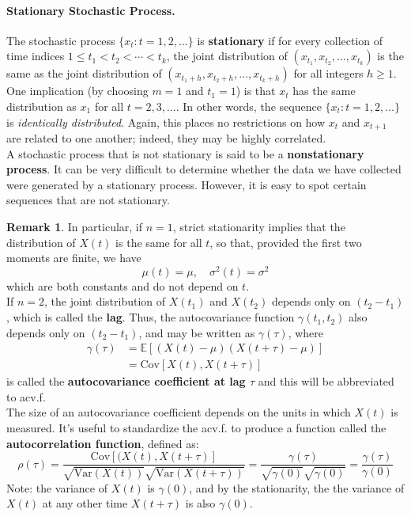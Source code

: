 \documentclass[a4paper, 10pt]{article}
\theoremstyle{definition}	%
\newtheorem*{remark}{Remark}
\begin{document}
\paragraph{Stationary Stochastic Process.}  
The stochastic process \( \{x_t: t = 1, 2, \dots \} \) is \textbf{stationary} if for every collection of time indices \( 1 \leq t_1 < t_2 < \cdots < t_k \), the joint distribution of \( (x_{t_1}, x_{t_2}, \ldots, x_{t_k}) \) is the same as the joint distribution of \( (x_{t_1+h}, x_{t_2+h}, \ldots, x_{t_k+h}) \) for all integers \( h \geq 1 \).\\
One implication (by choosing \( m = 1 \) and \( t_1 = 1 \)) is that \( x_t \) has the same distribution as \( x_1 \) for all \( t = 2, 3, \ldots \). In other words, the sequence \( \{x_t : t = 1, 2, \ldots\} \) is \textit{identically distributed}. Again, this places no restrictions on how \( x_t \) and \( x_{t+1} \) are related to one another; indeed, they may be highly correlated.\\
A stochastic process that is not stationary is said to be a \textbf{nonstationary process}. It can be very difficult to determine whether the data we have collected were generated by a stationary process. However, it is easy to spot certain sequences that are not stationary.
\begin{remark}
In particular, if \( n = 1 \), strict stationarity implies that the distribution of \( X(t) \) is the same for all \( t \), so that, provided the first two moments are finite, we have
\[
\mu(t) = \mu, \quad \sigma^2(t) = \sigma^2
\]
which are both constants and do not depend on \( t \).\\
If \( n = 2 \), the joint distribution of \( X(t_1) \) and \( X(t_2) \) depends only on \( (t_2 - t_1) \), which is called the \textbf{lag}.
Thus, the autocovariance function \( \gamma(t_1, t_2) \) also depends only on \( (t_2 - t_1) \), and may be written as \( \gamma(\tau) \), where
\begin{align*}
    \gamma(\tau) &= \mathbb{E} \left[ (X(t) - \mu)(X(t+\tau) - \mu) \right]\\ 
    &= \text{Cov}[X(t), X(t+\tau)]
\end{align*}
is called the \textbf{autocovariance coefficient at lag \( \tau \)} and this will be abbreviated to acv.f.\\
The size of an autocovariance coefficient depends on the units in which \( X(t) \) is measured. It's useful to standardize the acv.f. to produce a function called the \textbf{autocorrelation function}, defined as:
\[
\rho(\tau) = \frac{\mathrm{Cov}[(X(t), X(t+\tau)]}{\sqrt{\mathrm{Var}(X(t))}\sqrt{\mathrm{Var}(X(t+\tau))}} = \frac{\gamma(\tau)}{\sqrt{\gamma(0)}\sqrt{\gamma(0)}} = \frac{\gamma(\tau)}{\gamma(0)}
\]
Note: the variance of $X(t)$ is $\gamma(0)$, and by the stationarity, the the variance of $X(t)$ at any other time $X(t+\tau)$ is also $\gamma(0)$.
\end{remark}
\end{document}
